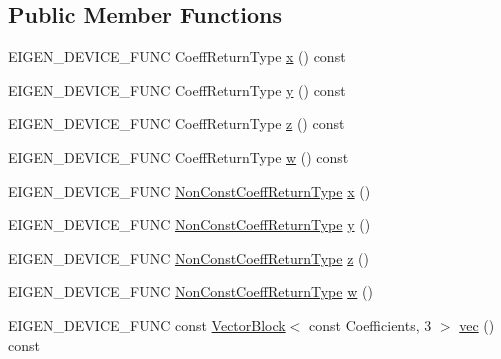 \subsection*{Public Member Functions}
\begin{DoxyCompactItemize}
\item 
E\+I\+G\+E\+N\+\_\+\+D\+E\+V\+I\+C\+E\+\_\+\+F\+U\+NC Coeff\+Return\+Type \mbox{\hyperlink{class_eigen_1_1_quaternion_base_af5a6618608a86232397a60d11dbad13d}{x}} () const
\item 
E\+I\+G\+E\+N\+\_\+\+D\+E\+V\+I\+C\+E\+\_\+\+F\+U\+NC Coeff\+Return\+Type \mbox{\hyperlink{class_eigen_1_1_quaternion_base_a77a62575ed017e4086145714db4e6502}{y}} () const
\item 
E\+I\+G\+E\+N\+\_\+\+D\+E\+V\+I\+C\+E\+\_\+\+F\+U\+NC Coeff\+Return\+Type \mbox{\hyperlink{class_eigen_1_1_quaternion_base_af76afdeb1d1441cbf09d4989437a930e}{z}} () const
\item 
E\+I\+G\+E\+N\+\_\+\+D\+E\+V\+I\+C\+E\+\_\+\+F\+U\+NC Coeff\+Return\+Type \mbox{\hyperlink{class_eigen_1_1_quaternion_base_a6221021558ba509e7a5a7fc68092034d}{w}} () const
\item 
E\+I\+G\+E\+N\+\_\+\+D\+E\+V\+I\+C\+E\+\_\+\+F\+U\+NC \mbox{\hyperlink{struct_eigen_1_1internal_1_1true__type}{Non\+Const\+Coeff\+Return\+Type}} \mbox{\hyperlink{class_eigen_1_1_quaternion_base_acf78705347fd7e4910004f2868f42350}{x}} ()
\item 
E\+I\+G\+E\+N\+\_\+\+D\+E\+V\+I\+C\+E\+\_\+\+F\+U\+NC \mbox{\hyperlink{struct_eigen_1_1internal_1_1true__type}{Non\+Const\+Coeff\+Return\+Type}} \mbox{\hyperlink{class_eigen_1_1_quaternion_base_aa4bf2ff0e4aa4b57d1d16ce21d17066f}{y}} ()
\item 
E\+I\+G\+E\+N\+\_\+\+D\+E\+V\+I\+C\+E\+\_\+\+F\+U\+NC \mbox{\hyperlink{struct_eigen_1_1internal_1_1true__type}{Non\+Const\+Coeff\+Return\+Type}} \mbox{\hyperlink{class_eigen_1_1_quaternion_base_a39397e0e9fa7e0a02512fc3f50c95542}{z}} ()
\item 
E\+I\+G\+E\+N\+\_\+\+D\+E\+V\+I\+C\+E\+\_\+\+F\+U\+NC \mbox{\hyperlink{struct_eigen_1_1internal_1_1true__type}{Non\+Const\+Coeff\+Return\+Type}} \mbox{\hyperlink{class_eigen_1_1_quaternion_base_ab24b4111eef9a4085b1cfe33291f45a9}{w}} ()
\item 
E\+I\+G\+E\+N\+\_\+\+D\+E\+V\+I\+C\+E\+\_\+\+F\+U\+NC const \mbox{\hyperlink{class_eigen_1_1_vector_block}{Vector\+Block}}$<$ const Coefficients, 3 $>$ \mbox{\hyperlink{class_eigen_1_1_quaternion_base_aa8a52640dfd34f910d18f110ccccd1b9}{vec}} () const
\item 

\end{DoxyCompactItemize}

